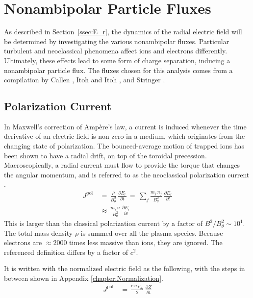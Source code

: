 \section{Nonambipolar Particle Fluxes}\label{sec:nonambipolar_fluxes}
As described in Section~\ref{ssec:E_r}, the dynamics of the radial electric field will be determined by investigating the various nonambipolar fluxes.
Particular turbulent and neoclassical phenomena affect ions and electrons differently.
Ultimately, these effects lead to some form of charge separation, inducing a nonambipolar particle flux.
The fluxes chosen for this analysis comes from a compilation by Callen \cite{callen_toroidal_2009}, Itoh and Itoh \cite{itoh_role_1996}, and Stringer \cite{stringer_explanation_1993}.

\subsection{Polarization Current}\label{ssec:polarization_current}
In Maxwell's correction of Amp\`ere's law, a current is induced whenever the time derivative of an electric field is non-zero in a medium, which originates from the changing state of polarization.
The bounced-average motion of trapped ions has been shown to have a radial drift, on top of the toroidal precession.
Macroscopically, a radial current must flow to provide the torque that changes the angular momentum, and is referred to as the neoclassical polarization current \cite{hinton_neoclassical_1984}.
\begin{align} %
	J^\text{pol} \,&=\, \frac{\rho}{B_\theta^2} \,
		\frac{\partial E_r}{\partial t} \,=\, \sum_j \frac{m_j \, n_j }
		{B_\theta^2} \, \frac{\partial E_r}{\partial t} \\
	\,&\approx\, \frac{m_i \, n}{B_\theta^2} \, \frac{\partial E_r}{\partial t}
		\label{eq:polarization_current_original}
\end{align}
This is larger than the classical polarization current by a factor of $B^2 / B_\theta^2 \sim 10^1$.
The total mass density $\rho$ is summed over all the plasma species.
Because electrons are $\approx 2000$ times less massive than ions, they are ignored.
The referenced definition differs by a factor of $c^2$.

It is written with the normalized electric field as the following, with the steps in between shown in Appendix \ref{chapter:Normalization}.
\begin{align} %
	J^\text{pol} \,&=\, \frac{e \, n \, \rho_{\theta i}}{2} \,
		\frac{\partial Z}{\partial t} \label{eq:polarization_current_normalized}
\end{align}


